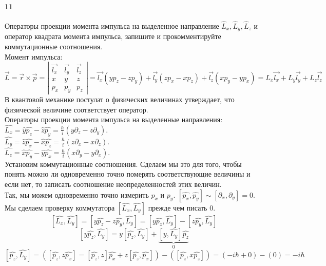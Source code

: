 


	\paragraph{11}
	Операторы проекции момента импульса на выделенное направление $\hat{L}_x, \hat{L}_y, \hat{L}_z$ и оператор квадрата момента импульса, запишите и прокомментируйте коммутационные соотношения.
	\\
	Момент импульса:\\
	$$\vec{L} = \vec{r} \times \vec{p} = \left|
	\begin{matrix}
	\vec{l_x} & \vec{l_y} & \vec{l_z} \\
	x & y & z \\
	p_x & p_y & p_z
	\end{matrix}
	\right| =
	\vec{l_x}(yp_z-zp_y)+
	\vec{l_y}(zp_x-xp_z)+
	\vec{l_z}(xp_y-yp_x) 
	=
	L_x\vec{l_x}+L_y\vec{l_y}+L_z\vec{l_z}
	 $$
	 В квантовой механике постулат о физических величинах утверждает, что физической величине соответствует оператор.\\
	 Операторы проекции момента импульса на выделенные направления:\\
	 $\widehat{L_x} = \widehat{y}\widehat{p_z} - \widehat{z}\widehat{p_y} = \frac{\hbar}{i}(y \partial_z - z \partial_y)$.\\
	 $\widehat{L_y} = \widehat{z}\widehat{p_x} - \widehat{x}\widehat{p_z} = \frac{\hbar}{i}(z \partial_x - x \partial_z)$.\\
	 $\widehat{L_z} = \widehat{x}\widehat{p_y} - \widehat{y}\widehat{p_x} = \frac{\hbar}{i}(x \partial_y - y \partial_x)$.\\
	 Установим коммутационные соотношения. Сделаем мы это для того, чтобы понять можно ли одновременно точно померять соответствующие величины и если нет, то записать соотношение неопределенностей этих величин.\\
	 Так, мы можем одновременно точно измерить $p_x$ и $p_y$. $[\widehat{p_x},\widehat{p_y}]\sim[\partial_x,\partial_y] = 0$.\\
	 Мы сделаем проверку коммутатора $[\widehat{L_x},\widehat{L_y}]$ прежде чем писать 0.\\
	 $$[\widehat{L_x},\widehat{L_y}] = [y\widehat{p_z} - z\widehat{p_y},\widehat{L_y}] = [y\widehat{p_z},\widehat{L_y}] - [z\widehat{p_y},\widehat{L_y}]$$
	 $$[y\widehat{p_z},\widehat{L_y}] = y[\widehat{p_z},\widehat{L_y}]+ \underbrace{[y,\widehat{L_y}]\widehat{p_z}}_0$$
	 $$
	 [\widehat{p_z},\widehat{L_y}]
	 =
	 \left([\widehat{p_z},z\widehat{p_x}] = [\widehat{p_z},z]\widehat{p_x}+z[\widehat{p_z},\widehat{p_x}]\right)
	 -
	 \left([\widehat{p_z},x\widehat{p_z}]\right)
	 =
	 (-i\hbar+0)
	 -
	 (0)
	 =
	 -i\hbar
	 $$

